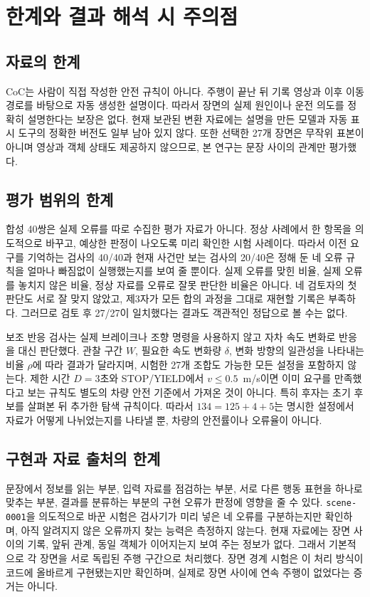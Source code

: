 \section{한계와 결과 해석 시 주의점}
\label{sec:threats}

\subsection{자료의 한계}
CoC는 사람이 직접 작성한 안전 규칙이 아니다. 주행이 끝난 뒤 기록 영상과 이후 이동 경로를 바탕으로 자동 생성한 설명이다. 따라서 장면의 실제 원인이나 운전 의도를 정확히 설명한다는 보장은 없다. 현재 보관된 변환 자료에는 설명을 만든 모델과 자동 표시 도구의 정확한 버전도 일부 남아 있지 않다. 또한 선택한 27개 장면은 무작위 표본이 아니며 영상과 객체 상태도 제공하지 않으므로, 본 연구는 문장 사이의 관계만 평가했다.

\subsection{평가 범위의 한계}
합성 40쌍은 실제 오류를 따로 수집한 평가 자료가 아니다. 정상 사례에서 한 항목을 의도적으로 바꾸고, 예상한 판정이 나오도록 미리 확인한 시험 사례이다. 따라서 이전 요구를 기억하는 검사의 40/40과 현재 사건만 보는 검사의 20/40은 정해 둔 네 오류 규칙을 얼마나 빠짐없이 실행했는지를 보여 줄 뿐이다. 실제 오류를 맞힌 비율, 실제 오류를 놓치지 않은 비율, 정상 자료를 오류로 잘못 판단한 비율은 아니다. 네 검토자의 첫 판단도 서로 잘 맞지 않았고, 제3자가 모든 합의 과정을 그대로 재현할 기록은 부족하다. 그러므로 검토 후 27/27이 일치했다는 결과도 객관적인 정답으로 볼 수는 없다.

보조 반응 검사는 실제 브레이크나 조향 명령을 사용하지 않고 자차 속도 변화로 반응을 대신 판단했다. 관찰 구간 $W$, 필요한 속도 변화량 $\delta$, 변화 방향의 일관성을 나타내는 비율 $\rho$에 따라 결과가 달라지며, 시험한 27개 조합도 가능한 모든 설정을 포함하지 않는다. 제한 시간 $D=3$초와 STOP/YIELD에서 $v\leq0.5$~m/s이면 이미 요구를 만족했다고 보는 규칙도 별도의 차량 안전 기준에서 가져온 것이 아니다. 특히 후자는 초기 후보를 살펴본 뒤 추가한 탐색 규칙이다. 따라서 $134=125+4+5$는 명시한 설정에서 자료가 어떻게 나뉘었는지를 나타낼 뿐, 차량의 안전률이나 오류율이 아니다.

\subsection{구현과 자료 출처의 한계}
문장에서 정보를 읽는 부분, 입력 자료를 점검하는 부분, 서로 다른 행동 표현을 하나로 맞추는 부분, 결과를 분류하는 부분의 구현 오류가 판정에 영향을 줄 수 있다. \texttt{scene-0001}을 의도적으로 바꾼 시험은 검사기가 미리 넣은 네 오류를 구분하는지만 확인하며, 아직 알려지지 않은 오류까지 찾는 능력은 측정하지 않는다. 현재 자료에는 장면 사이의 기록, 앞뒤 관계, 동일 객체가 이어지는지 보여 주는 정보가 없다. 그래서 기본적으로 각 장면을 서로 독립된 주행 구간으로 처리했다. 장면 경계 시험은 이 처리 방식이 코드에 올바르게 구현됐는지만 확인하며, 실제로 장면 사이에 연속 주행이 없었다는 증거는 아니다.

